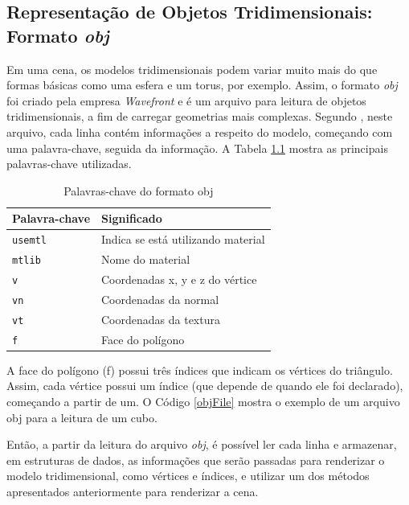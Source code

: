\begin{anexosenv}
\chapter{Representação de Objetos Tridimensionais: Formato \textit{obj}}
\label{formatobj}

	Em uma cena, os modelos tridimensionais podem variar muito mais do que formas básicas como uma esfera e um torus, por exemplo. Assim, o formato \textit{obj} foi criado pela empresa  \textit{Wavefront} e é um arquivo para leitura de objetos tridimensionais, a fim de carregar geometrias mais complexas. Segundo \cite{graphicsprog}, neste arquivo, cada linha contém informações a respeito do modelo, começando com uma palavra-chave, seguida da informação. A  Tabela \ref{palavraschave} mostra as principais palavras-chave utilizadas. 

\begin{table}[ht]
	\centering	
	\begin{tabular}{ll}
		\toprule
		\textbf{Palavra-chave} & \textbf{Significado}  \\
		\midrule
		\texttt{usemtl} & Indica se está utilizando material  \\
		\texttt{mtlib} &  Nome do material \\
		\texttt{v} &  Coordenadas x, y e z do vértice \\
		\texttt{vn} & Coordenadas da normal \\
		\texttt{vt} &  Coordenadas da textura \\
		\texttt{f} &  Face do polígono \\
		\bottomrule
	\end{tabular}
	\caption{ Palavras-chave do formato obj}
	\label{palavraschave}
\end{table}

	A face do polígono (f) possui três índices que indicam os vértices do triângulo. Assim, cada vértice possui um índice (que depende de quando ele foi declarado), começando a partir de um. O Código \ref{objFile} mostra o exemplo de um arquivo obj para a leitura de um cubo. 

	

	Então, a partir da leitura do arquivo  \textit{obj}, é possível ler cada linha e armazenar, em estruturas de dados, as informações que serão passadas para renderizar o modelo tridimensional, como vértices e índices, e utilizar um dos métodos apresentados anteriormente para renderizar a cena. 


\end{anexosenv}

